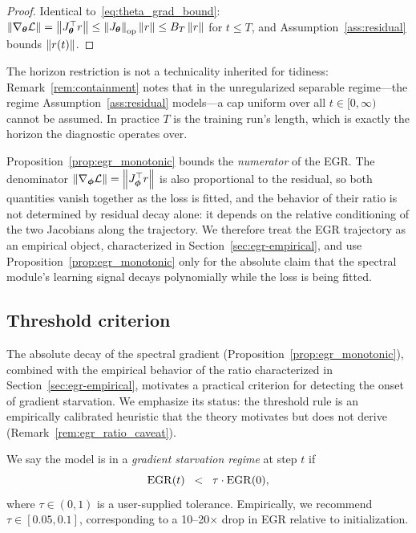 \begin{proof}
Identical to~\eqref{eq:theta_grad_bound}:
$\left\lVert\nabla_{\boldsymbol{\theta}} \mathcal{L}\right\rVert = \left\lVert J_{\boldsymbol{\theta}}^\top r\right\rVert \leq
\left\lVert J_{\boldsymbol{\theta}}\right\rVert_{\mathrm{op}} \left\lVert r\right\rVert \leq B_T \left\lVert r\right\rVert$ for
$t \leq T$, and Assumption~\ref{ass:residual} bounds
$\left\lVert r(t)\right\rVert$.
\end{proof}

\begin{remark}
The horizon restriction is not a technicality inherited for
tidiness: Remark~\ref{rem:containment} notes that in the
unregularized separable regime---the regime
Assumption~\ref{ass:residual} models---a cap uniform over all
$t \in [0, \infty)$ cannot be assumed. In practice $T$ is the
training run's length, which is exactly the horizon the diagnostic
operates over.
\end{remark}

\begin{remark}
\label{rem:egr_ratio_caveat}
Proposition~\ref{prop:egr_monotonic} bounds the \emph{numerator} of
the EGR. The denominator $\left\lVert\nabla_{\boldsymbol{\phi}} \mathcal{L}\right\rVert =
\left\lVert J_{\boldsymbol{\phi}}^\top r\right\rVert$ is also proportional to the residual, so both
quantities vanish together as the loss is fitted, and the behavior of
their ratio is not determined by residual decay alone: it depends on
the relative conditioning of the two Jacobians along the trajectory.
We therefore treat the EGR trajectory as an empirical object,
characterized in Section~\ref{sec:egr-empirical}, and use
Proposition~\ref{prop:egr_monotonic} only for the absolute claim that
the spectral module's learning signal decays polynomially while the
loss is being fitted.
\end{remark}

\subsection{Threshold criterion}

The absolute decay of the spectral gradient
(Proposition~\ref{prop:egr_monotonic}), combined with the empirical
behavior of the ratio characterized in
Section~\ref{sec:egr-empirical}, motivates a practical criterion for
detecting the onset of gradient starvation. We emphasize its status:
the threshold rule is an empirically calibrated heuristic that the
theory motivates but does not derive
(Remark~\ref{rem:egr_ratio_caveat}).

\begin{definition}
\label{def:alert}
We say the model is in a \emph{gradient starvation regime} at step $t$
if
\[
    \mathrm{EGR}(t) \;\;<\;\; \tau \cdot \mathrm{EGR}(0),
\]
where $\tau \in (0, 1)$ is a user-supplied tolerance. Empirically, we
recommend $\tau \in [0.05, 0.1]$, corresponding to a 10--20$\times$
drop in EGR relative to initialization.
\end{definition}

